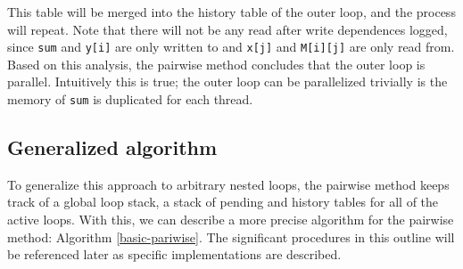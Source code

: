 \documentclass[12pt,twoside]{reedthesis}
\begin{document}
		This table will be merged into the history table of the outer loop, and the process will repeat. Note that there will not be any read after write dependences logged, since \texttt{sum} and \texttt{y[i]} are only written to and \texttt{x[j]} and \texttt{M[i][j]} are only read from. Based on this analysis, the pairwise method concludes that the outer loop is parallel. 
		Intuitively this is true; the outer loop can be parallelized trivially is the memory of \texttt{sum} is duplicated for each thread. 
	
		\subsection{Generalized algorithm}
		
		To generalize this approach to arbitrary nested loops, the pairwise method keeps track of a global loop stack, a stack of pending and history tables for all of the active loops. With this, we can describe a more precise algorithm for the pairwise method: Algorithm \ref{basic-pariwise}. The significant procedures in this outline will be referenced later as specific implementations are described.
		
\end{document}
